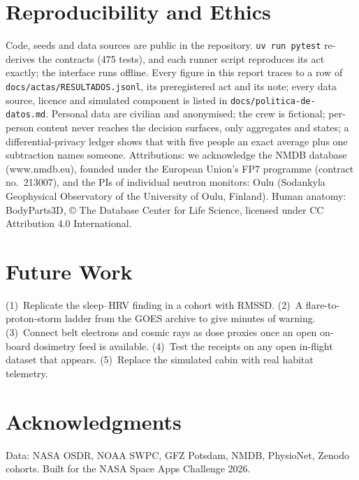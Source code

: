 \documentclass[conference]{IEEEtran}
\begin{document}
\section{Reproducibility and Ethics}
Code, seeds and data sources are public in the repository. \texttt{uv run pytest} re-derives the contracts (475 tests), and each runner script reproduces its act exactly; the interface runs offline. Every figure in this report traces to a row of \texttt{docs/actas/RESULTADOS.jsonl}, its preregistered act and its note; every data source, licence and simulated component is listed in \texttt{docs/politica-de-datos.md}. Personal data are civilian and anonymised; the crew is fictional; per-person content never reaches the decision surfaces, only aggregates and states; a differential-privacy ledger shows that with five people an exact average plus one subtraction names someone. Attributions: we acknowledge the NMDB database (www.nmdb.eu), founded under the European Union's FP7 programme (contract no.\ 213007), and the PIs of individual neutron monitors: Oulu (Sodankyla Geophysical Observatory of the University of Oulu, Finland). Human anatomy: BodyParts3D, \copyright{} The Database Center for Life Science, licensed under CC Attribution 4.0 International.

\section{Future Work}
(1)~Replicate the sleep--HRV finding in a cohort with RMSSD. (2)~A flare-to-proton-storm ladder from the GOES archive to give minutes of warning. (3)~Connect belt electrons and cosmic rays as dose proxies once an open on-board dosimetry feed is available. (4)~Test the receipts on any open in-flight dataset that appears. (5)~Replace the simulated cabin with real habitat telemetry.

\section*{Acknowledgments}
Data: NASA OSDR, NOAA SWPC, GFZ Potsdam, NMDB, PhysioNet, Zenodo cohorts. Built for the NASA Space Apps Challenge 2026.
\end{document}
